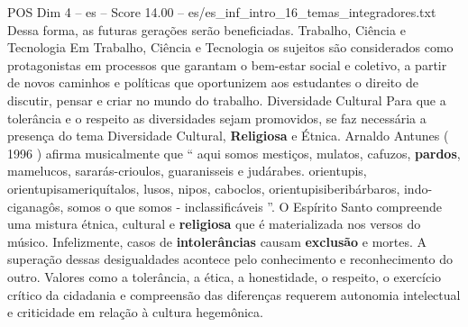 \begin{textsample}{POS Dim 4 – es – Score 14.00 – es/es\_inf\_intro\_16\_temas\_integradores.txt}
Dessa forma, as futuras gerações serão beneficiadas.
Trabalho, Ciência e Tecnologia Em Trabalho, Ciência e Tecnologia os sujeitos são considerados como protagonistas em processos que garantam o bem-estar social e coletivo, a partir de novos caminhos e políticas que oportunizem aos estudantes o direito de discutir, pensar e criar no mundo do trabalho.
Diversidade Cultural Para que a tolerância e o respeito as diversidades sejam promovidos, se faz necessária a presença do tema Diversidade Cultural, \textbf{Religiosa} e Étnica.
Arnaldo Antunes ( 1996 ) afirma musicalmente que “ aqui somos mestiços, mulatos, cafuzos, \textbf{pardos}, mamelucos, sararás-crioulos, guaranisseis e judárabes. orientupis, orientupisameriquítalos, lusos, nipos, caboclos, orientupisiberibárbaros, indo-ciganagôs, somos o que somos - inclassificáveis ”.
O Espírito Santo compreende uma mistura étnica, cultural e \textbf{religiosa} que é materializada nos versos do músico.
Infelizmente, casos de \textbf{intolerâncias} causam \textbf{exclusão} e mortes.
A superação dessas desigualdades acontece pelo conhecimento e reconhecimento do outro.
Valores como a tolerância, a ética, a honestidade, o respeito, o exercício crítico da cidadania e compreensão das diferenças requerem autonomia intelectual e criticidade em relação à cultura hegemônica.

\end{textsample}
